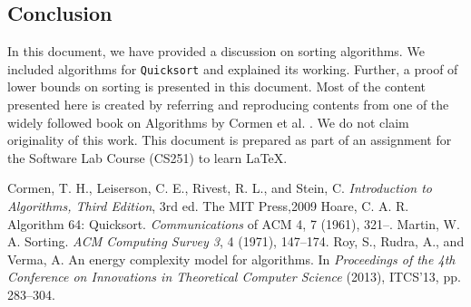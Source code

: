 \documentclass[a4paper,10pt]{article}
\begin{document}
\begin{multicols*}{2}
\section{Conclusion}
    In this document, we have provided a discussion on sorting algorithms. We included algorithms for \texttt{Quicksort} and explained its working. Further, a proof of lower bounds on sorting is presented in this document. Most of the content presented here is created by referring and reproducing contents from one of the widely followed book on Algorithms by Cormen et al. \cite{clrs}. We do not claim originality of this work. This document is prepared as part of an assignment for the Software Lab Course (CS251) to learn \LaTeX.

\begin{thebibliography}{20}
    Cormen, T. H., Leiserson, C. E., Rivest, R. L., and Stein, C. \textit{Introduction to Algorithms, Third Edition}, 3rd ed. The MIT Press,2009
    Hoare, C. A. R. Algorithm 64: Quicksort. \textit{Communications} of ACM 4, 7 (1961), 321–.
    Martin, W. A. Sorting. \textit{ACM Computing Survey 3}, 4 (1971), 147–174.
    Roy, S., Rudra, A., and Verma, A. An energy complexity model for algorithms. In \textit{Proceedings of the 4th Conference on Innovations in Theoretical Computer Science} (2013), ITCS'13, pp. 283–304.
\end{thebibliography}

\end{multicols*}
\end{document}
